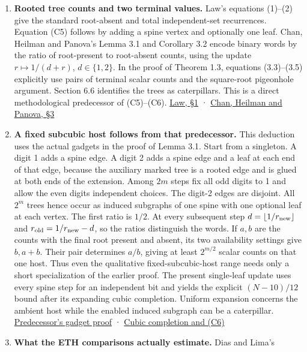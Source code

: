 \documentclass[11pt,a4paper]{article}
\begin{document}
\begin{enumerate}
\def\labelenumi{\arabic{enumi}.}
\item
  \textbf{Rooted tree counts and two terminal values.} Law's equations
  (1)--(2) give the standard root-absent and total independent-set
  recurrences. Equation (C5) follows by adding a spine vertex and
  optionally one leaf. Chan, Heilman and Panova's Lemma 3.1 and
  Corollary 3.2 encode binary words by the ratio of root-present to
  root-absent counts, using the update \(r\mapsto 1/(d+r)\),
  \(d\in\{1,2\}\). In the proof of Theorem 1.3, equations (3.3)--(3.5)
  explicitly use pairs of terminal scalar counts and the square-root
  pigeonhole argument. Section 6.6 identifies the trees as caterpillars.
  This is a direct methodological predecessor of (C5)--(C6).
  \href{https://www.combinatorics.org/ojs/index.php/eljc/article/download/v17i1n18/pdf/}{Law,
  §1} · \href{https://arxiv.org/html/2604.19094v1\#S3}{Chan, Heilman and
  Panova, §3}
\item
  \textbf{A fixed subcubic host follows from that predecessor.} This
  deduction uses the actual gadgets in the proof of Lemma 3.1. Start
  from a singleton. A digit 1 adds a spine edge. A digit 2 adds a spine
  edge and a leaf at each end of that edge, because the auxiliary marked
  tree is a rooted edge and is glued at both ends of the extension.
  Among \(2m\) steps fix all odd digits to 1 and allow the even digits
  independent choices. The digit-2 edges are disjoint. All \(2^m\) trees
  hence occur as induced subgraphs of one spine with one optional leaf
  at each vertex. The first ratio is \(1/2\). At every subsequent step
  \(d=\lfloor1/r_{\rm new}\rfloor\) and \(r_{\rm old}=1/r_{\rm new}-d\),
  so the ratios distinguish the words. If \(a,b\) are the counts with
  the final root present and absent, its two availability settings give
  \(b,a+b\). Their pair determines \(a/b\), giving at least \(2^{m/2}\)
  scalar counts on that one host. Thus even the qualitative
  fixed-subcubic-host range needs only a short specialization of the
  earlier proof. The present single-leaf update uses every spine step
  for an independent bit and yields the explicit \((N-10)/12\) bound
  after its expanding cubic completion. Uniform expansion concerns the
  ambient host while the enabled induced subgraph can be a caterpillar.
  \href{https://arxiv.org/html/2604.19094v1\#S3}{Predecessor's gadget
  proof} · \hyperref[v8-section-pooled-menu-barrier]{Cubic completion and
  (C6)}
\item
  \textbf{What the ETH comparisons actually estimate.} Dias and Lima's

\end{enumerate}
\end{document}
